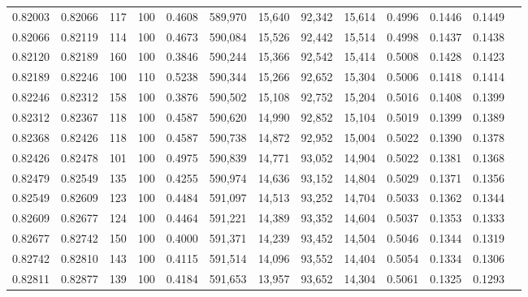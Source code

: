 \begin{tabular}{rrrrrrrrrrrrr}
0.82003 & 0.82066 &   117 & 100 &                                     0.4608 & 589,970 &  15,640 &  92,342 &  15,614 & 0.4996 & 0.1446 & 0.1449 \\
0.82066 & 0.82119 &   114 & 100 &                                     0.4673 & 590,084 &  15,526 &  92,442 &  15,514 & 0.4998 & 0.1437 & 0.1438 \\
0.82120 & 0.82189 &   160 & 100 &                                     0.3846 & 590,244 &  15,366 &  92,542 &  15,414 & 0.5008 & 0.1428 & 0.1423 \\
0.82189 & 0.82246 &   100 & 110 &                                     0.5238 & 590,344 &  15,266 &  92,652 &  15,304 & 0.5006 & 0.1418 & 0.1414 \\
0.82246 & 0.82312 &   158 & 100 &                                     0.3876 & 590,502 &  15,108 &  92,752 &  15,204 & 0.5016 & 0.1408 & 0.1399 \\
0.82312 & 0.82367 &   118 & 100 &                                     0.4587 & 590,620 &  14,990 &  92,852 &  15,104 & 0.5019 & 0.1399 & 0.1389 \\
0.82368 & 0.82426 &   118 & 100 &                                     0.4587 & 590,738 &  14,872 &  92,952 &  15,004 & 0.5022 & 0.1390 & 0.1378 \\
0.82426 & 0.82478 &   101 & 100 &                                     0.4975 & 590,839 &  14,771 &  93,052 &  14,904 & 0.5022 & 0.1381 & 0.1368 \\
0.82479 & 0.82549 &   135 & 100 &                                     0.4255 & 590,974 &  14,636 &  93,152 &  14,804 & 0.5029 & 0.1371 & 0.1356 \\
0.82549 & 0.82609 &   123 & 100 &                                     0.4484 & 591,097 &  14,513 &  93,252 &  14,704 & 0.5033 & 0.1362 & 0.1344 \\
0.82609 & 0.82677 &   124 & 100 &                                     0.4464 & 591,221 &  14,389 &  93,352 &  14,604 & 0.5037 & 0.1353 & 0.1333 \\
0.82677 & 0.82742 &   150 & 100 &                                     0.4000 & 591,371 &  14,239 &  93,452 &  14,504 & 0.5046 & 0.1344 & 0.1319 \\
0.82742 & 0.82810 &   143 & 100 &                                     0.4115 & 591,514 &  14,096 &  93,552 &  14,404 & 0.5054 & 0.1334 & 0.1306 \\
0.82811 & 0.82877 &   139 & 100 &                                     0.4184 & 591,653 &  13,957 &  93,652 &  14,304 & 0.5061 & 0.1325 & 0.1293 \\

\end{tabular}
